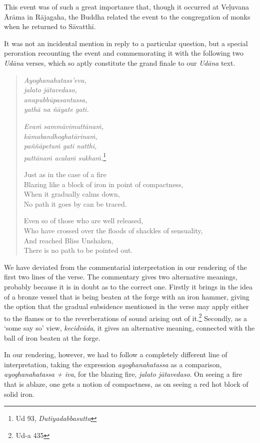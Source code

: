 This event was of such a great importance that, though it occurred at Veḷuvana Ārāma in Rājagaha, the Buddha related the event to the congregation of monks when he returned to Sāvatthī.

It was not an incidental mention in reply to a particular question, but a special peroration recounting the event and commemorating it with the following two \emph{Udāna} verses, which so aptly constitute the grand finale to our \emph{Udāna} text.

\begin{quote}
\emph{Ayoghanahatass'eva,}\\
\emph{jalato jātavedaso,}\\
\emph{anupubbūpasantassa,}\\
\emph{yathā na ñāyate gati.}

\emph{Evaṁ sammāvimuttānaṁ,}\\
\emph{kāmabandhoghatārinaṁ,}\\
\emph{paññāpetuṁ gatī natthi,}\\
\emph{pattānaṁ acalaṁ sukhaṁ.}\footnote{Ud 93, \emph{Dutiyadabbasutta}}

Just as in the case of a fire\\
Blazing like a block of iron in point of compactness,\\
When it gradually calms down,\\
No path it goes by can be traced.

Even so of those who are well released,\\
Who have crossed over the floods of shackles of sensuality,\\
And reached Bliss Unshaken,\\
There is no path to be pointed out.
\end{quote}

We have deviated from the commentarial interpretation in our rendering of the first two lines of the verse. The commentary gives two alternative meanings, probably because it is in doubt as to the correct one. Firstly it brings in the idea of a bronze vessel that is being beaten at the forge with an iron hammer, giving the option that the gradual subsidence mentioned in the verse may apply either to the flames or to the reverberations of sound arising out of it.\footnote{Ud-a 435} Secondly, as a `some say so' view, \emph{kecidvāda}, it gives an alternative meaning, connected with the ball of iron beaten at the forge.

In our rendering, however, we had to follow a completely different line of interpretation, taking the expression \emph{ayoghanahatassa} as a comparison, \emph{ayoghanahatassa + iva}, for the blazing fire, \emph{jalato jātavedaso}. On seeing a fire that is ablaze, one gets a notion of compactness, as on seeing a red hot block of solid iron.

